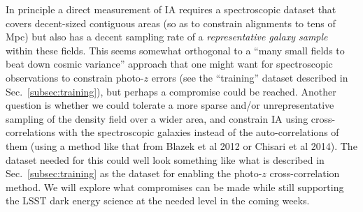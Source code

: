 In principle a direct measurement of IA requires a spectroscopic dataset that covers decent-sized
contiguous areas (so as to constrain alignments to tens of Mpc) but also has a decent sampling rate
of a {\em representative galaxy sample} within these fields.  This seems somewhat orthogonal to a
``many small fields to beat down cosmic variance'' approach that one might want for spectroscopic
observations to constrain photo-$z$ errors (see the ``training'' dataset described in
Sec.~\ref{subsec:training}), but perhaps a compromise could be reached.  Another question is whether
we could tolerate a more sparse and/or unrepresentative sampling of the density field over a wider
area, and constrain IA using cross-correlations with the spectroscopic galaxies instead of the
auto-correlations of them (using a method like that from Blazek et al 2012 or Chisari et al 2014).
The dataset needed for this could well look something like what is described in
Sec.~\ref{subsec:training} as the dataset for enabling the photo-$z$ cross-correlation method. We
will explore what compromises can be made while still supporting the LSST dark energy science at the
needed level in the coming weeks.
